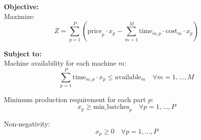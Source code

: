 \documentclass{article}
\begin{document}
\textbf{Objective:}\\
Maximize:
\[
Z = \sum_{p=1}^{P} \left( \text{price}_p \cdot x_p - \sum_{m=1}^{M} \text{time}_{m,p} \cdot \text{cost}_m \cdot x_p \right)
\]

\textbf{Subject to:}\\
Machine availability for each machine \( m \):
\[
\sum_{p=1}^{P} \text{time}_{m,p} \cdot x_p \leq \text{available}_m \quad \forall m = 1, \ldots, M
\]

Minimum production requirement for each part \( p \):
\[
x_p \geq \text{min\_batches}_p \quad \forall p = 1, \ldots, P
\]

Non-negativity:
\[
x_p \geq 0 \quad \forall p = 1, \ldots, P
\]
\end{document}
